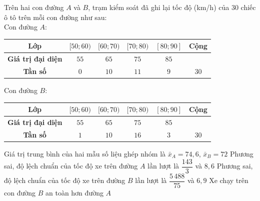 \begin{ex}%

	Trên hai con đường $A$ và $B$, trạm kiểm soát đã ghi lại tốc độ (km/h) của $30$ chiếc ô tô trên mỗi con đường như sau:\\
	Con đường $A$:
	\begin{center}
		\begin{tabular}{|c|c|c|c|c|c|}
			\hline 
			\bf Lớp &$[50;60)$ &$[60;70)$ &$[70;80)$&$[80;90]$& Cộng\\ 
			\hline
			\bf Giá trị đại diện &$55$&$65$&$75$&$85$&\\
			\hline
			\bf Tần số &$0$&$10$&$11$&$9$&$30$\\
			\hline
		\end{tabular}
	\end{center}
	Con đường $B$:
	\begin{center}
		\begin{tabular}{|c|c|c|c|c|c|}
			\hline 
			\bf Lớp &$[50;60)$ &$[60;70)$ &$[70;80)$&$[80;90]$& Cộng\\ 
			\hline
			\bf Giá trị đại diện &$55$&$65$&$75$&$85$&\\
			\hline
			\bf Tần số &$1$&$10$&$16$&$3$&$30$\\
			\hline
		\end{tabular}
	\end{center}
	\choiceTF
	{\True Giá trị trung bình của hai mẫu số liệu ghép nhóm là $\bar{x}_A=74{,}6$, $\bar{x}_B=72$}
	{Phương sai, độ lệch chuẩn của tốc độ xe trên đường $A$ lần lượt là $\dfrac{143}{3}$ và $8{,}6$}
	{Phương sai, độ lệch chuẩn của tốc độ xe trên đường $B$ lần lượt là $\dfrac{5\,488}{75}$ và $6{,}9$}
	{\True Xe chạy trên con đường $B$ an toàn hơn đường $A$}
\end{ex}

